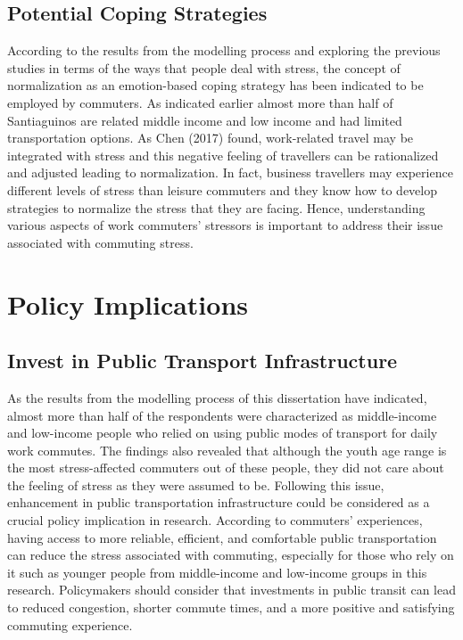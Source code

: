 \documentclass[
11pt, %
oneside, %
english, %
singlespacing, %
]{macthesis} %
\begin{document}
\hypertarget{potential-coping-strategies}{%
\subsection{Potential Coping Strategies}\label{potential-coping-strategies}}

According to the results from the modelling process and exploring the previous studies in terms of the ways that people deal with stress, the concept of normalization as an emotion-based coping strategy has been indicated to be employed by commuters. As indicated earlier almost more than half of Santiaguinos are related middle income and low income and had limited transportation options. As Chen (2017) found, work-related travel may be integrated with stress and this negative feeling of travellers can be rationalized and adjusted leading to normalization. In fact, business travellers may experience different levels of stress than leisure commuters and they know how to develop strategies to normalize the stress that they are facing. Hence, understanding various aspects of work commuters' stressors is important to address their issue associated with commuting stress.

\hypertarget{policy-implications}{%
\section{Policy Implications}\label{policy-implications}}

\hypertarget{invest-in-public-transport-infrastructure}{%
\subsection{Invest in Public Transport Infrastructure}\label{invest-in-public-transport-infrastructure}}

As the results from the modelling process of this dissertation have indicated, almost more than half of the respondents were characterized as middle-income and low-income people who relied on using public modes of transport for daily work commutes. The findings also revealed that although the youth age range is the most stress-affected commuters out of these people, they did not care about the feeling of stress as they were assumed to be. Following this issue, enhancement in public transportation infrastructure could be considered as a crucial policy implication in research. According to commuters' experiences, having access to more reliable, efficient, and comfortable public transportation can reduce the stress associated with commuting, especially for those who rely on it such as younger people from middle-income and low-income groups in this research. Policymakers should consider that investments in public transit can lead to reduced congestion, shorter commute times, and a more positive and satisfying commuting experience.
\end{document}
